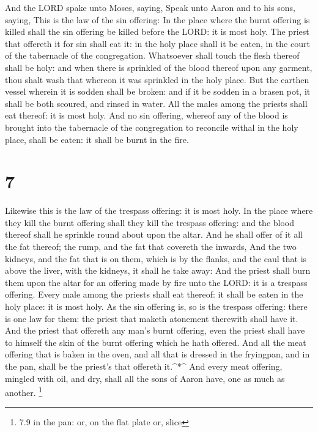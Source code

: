  And the LORD spake unto Moses, saying,  Speak
unto Aaron and to his sons, saying, This is the law of the sin offering:
In the place where the burnt offering is killed shall the sin offering
be killed before the LORD: it is most holy.  The priest
that offereth it for sin shall eat it: in the holy place shall it be
eaten, in the court of the tabernacle of the congregation. 
Whatsoever shall touch the flesh thereof shall be holy: and when there
is sprinkled of the blood thereof upon any garment, thou shalt wash that
whereon it was sprinkled in the holy place.  But the
earthen vessel wherein it is sodden shall be broken: and if it be sodden
in a brasen pot, it shall be both scoured, and rinsed in water.
 All the males among the priests shall eat thereof: it is
most holy.  And no sin offering, whereof any of the blood
is brought into the tabernacle of the congregation to reconcile withal
in the holy place, shall be eaten: it shall be burnt in the fire.

\hypertarget{section-6}{%
\section{7}\label{section-6}}

 Likewise this is the law of the trespass offering: it is
most holy.  In the place where they kill the burnt offering
shall they kill the trespass offering: and the blood thereof shall he
sprinkle round about upon the altar.  And he shall offer of
it all the fat thereof; the rump, and the fat that covereth the inwards,
 And the two kidneys, and the fat that is on them, which is
by the flanks, and the caul that is above the liver, with the kidneys,
it shall he take away:  And the priest shall burn them upon
the altar for an offering made by fire unto the LORD: it is a trespass
offering.  Every male among the priests shall eat thereof:
it shall be eaten in the holy place: it is most holy.  As
the sin offering is, so is the trespass offering: there is one law for
them: the priest that maketh atonement therewith shall have it.
 And the priest that offereth any man's burnt offering, even
the priest shall have to himself the skin of the burnt offering which he
hath offered.  And all the meat offering that is baken in
the oven, and all that is dressed in the fryingpan, and in the pan,
shall be the priest's that offereth it.\^{}*\^{}  And every
meat offering, mingled with oil, and dry, shall all the sons of Aaron
have, one as much as another. \footnote{7.9 in the pan: or, on the flat
  plate or, slice}

